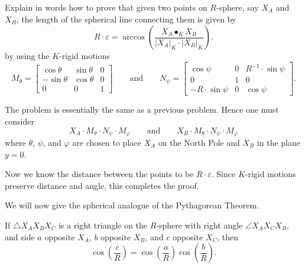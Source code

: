\documentclass{ximera}
\begin{document}
\begin{problem}
  Explain in words how to prove that given two points on $R$-sphere,
  say $X_A$ and $X_B$, the length of the spherical line connecting them
  is given by
  \[
  R\cdot \varepsilon = \arccos\left(\frac{X_A\bullet_K X_B}{|X_A|_K\cdot |X_B|_K}\right).
  \]
  by using the $K$-rigid motions
  \[
   M_\theta=
  \begin{bmatrix}
    \cos\theta & \sin\theta & 0\\
    -\sin\theta & \cos\theta & 0\\
    0 & 0 & 1
  \end{bmatrix}
  \qquad\text{and}\qquad
  N_\psi=
  \begin{bmatrix}
    \cos\psi & 0 & R^{-1}\cdot\sin\psi\\
    0 & 1 & 0\\
    -R\cdot\sin\psi & 0 & \cos\psi
  \end{bmatrix}.
  \]
  \begin{freeResponse}
    The problem is essentially the same as a previous problem. Hence one must consider
    \[
    X_A\cdot M_\theta\cdot N_\psi\cdot M_\varphi \qquad\text{and}\qquad
    X_B\cdot M_\theta\cdot N_\psi\cdot M_\varphi
    \]
    where $\theta$, $\psi$, and $\varphi$ are chosen to place $X_A$ on
    the North Pole and $X_B$ in the plane $y=0$.

    Now we know the distance between the points to be $R\cdot
    \varepsilon$. Since $K$-rigid motions preserve distance and angle,
    this completes the proof.
  \end{freeResponse}
\end{problem}


We will now give the spherical analogue of the Pythagorean Theorem.

\begin{theorem}
  If $\triangle X_AX_BX_C$ is a right triangle on the $R$-sphere with right
  angle $\angle X_AX_CX_B$, and side $a$ opposite $X_A$, $b$ opposite $X_B$,
  and $c$ opposite $X_C$, then
  \[
  \cos\left(\frac{c}{R}\right)=\cos\left(\frac{a}{R}\right)\cos\left(\frac{b}{R}\right).
  \]
\end{theorem}
\end{document}
